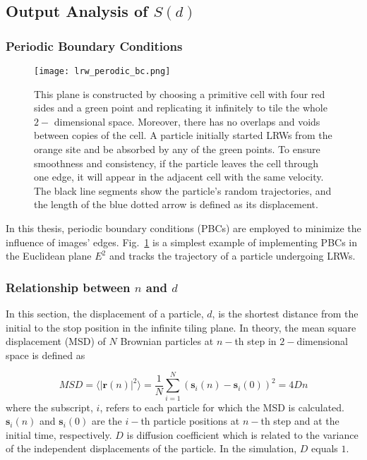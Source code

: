 


\subsection{Output Analysis of $S(d)$}


  \subsubsection{Periodic Boundary Conditions}

      \begin{figure}
         \centering
         \texttt{[image: lrw\_perodic\_bc.png]}
         \caption{This plane is constructed by choosing a primitive
           cell with four red sides and a green point and replicating
           it infinitely to tile the whole $2-$ dimensional
           space. Moreover, there has no overlaps and voids between
           copies of the cell. A particle initially started LRWs from
           the orange site and be absorbed by any of the green points.
           To ensure smoothness and consistency, if the particle
           leaves the cell through one edge, it will appear in the
           adjacent cell with the same velocity. The black line
           segments show the particle's random trajectories, and the
           length of the blue dotted arrow is defined as its
           displacement.}
         \label{fig:pbc_lrws}
      \end{figure}


      In this thesis, periodic boundary conditions (PBCs) are employed
      to minimize the influence of images'
      edges. Fig.~\ref{fig:pbc_lrws} is a simplest example of
      implementing PBCs in the Euclidean plane $E^2$ and tracks the
      trajectory of a particle undergoing LRWs. 




    \subsubsection{Relationship between $n$ and $d$}

     In this section, the displacement of a particle, $d$, is the
     shortest distance from the initial to the stop position in the
     infinite tiling plane. In theory, the mean square displacement
     (MSD) of $N$ Brownian particles at $n-$th step in $2-$dimensional
     space is defined as

     \begin{equation}\label{eq:mds_N}
       MSD = \langle \lvert \bm{r}(n) \lvert^2 \rangle = \frac{1}{N} \sum^{N}_{i=1} (\bm{s}_{i}(n) - \bm{s}_{i}(0))^2 = 4Dn
     \end{equation}
     where the subscript, $i$, refers to each particle for which the
     MSD is calculated. $\bm{s}_{i}(n)$ and $\bm{s}_{i}(0)$ are the
     $i-$th particle positions at $n-$th step and at the initial time,
     respectively. $D$ is diffusion coefficient which is related to
     the variance of the independent displacements of the
     particle. In the simulation, $D$ equals $1$.
     
